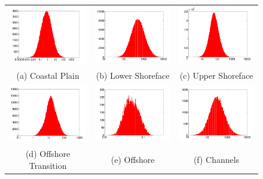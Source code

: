 \begin{figure}
\begin{tabular}{ccc}
\includegraphics[width=0.3 \linewidth,natwidth=504bp,natheight=385bp]{./figurer/kxh_1.pdf}&
\includegraphics[width=0.3 \linewidth,natwidth=508bp,natheight=385bp]{./figurer/kxh_2.pdf}&
\includegraphics[width=0.3 \linewidth,natwidth=474bp,natheight=399bp]{./figurer/kxh_3.pdf}\\(a) Coastal Plain&(b) Lower Shoreface&(c) Upper Shoreface\\
\includegraphics[width=0.3 \linewidth,natwidth=512bp,natheight=385bp]{./figurer/kxh_4.pdf}&
\includegraphics[width=0.3 \linewidth,natwidth=478bp,natheight=385bp]{./figurer/kxh_5.pdf}&
\includegraphics[width=0.3 \linewidth,natwidth=508bp,natheight=385bp]{./figurer/kxh_6.pdf}\\(d) Offshore Transition&(e) Offshore&(f) Channels\\

\end{tabular}
\end{figure}
